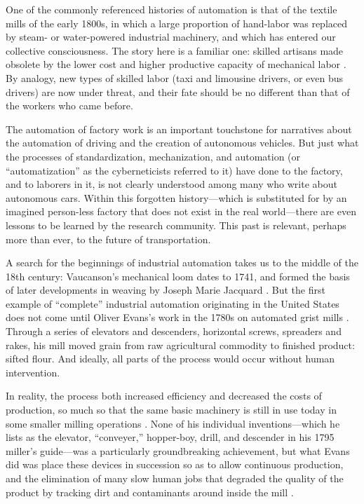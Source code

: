 One of the commonly referenced histories of automation is that of the
textile mills of the early 1800s, in which a large
proportion of hand-labor was replaced by steam- or
water-powered industrial machinery, and which has entered our collective
consciousness. The
story here is a familiar one: skilled artisans made obsolete by the
lower cost and higher productive capacity of mechanical labor \cite{pewPositive}. By
analogy, new types of skilled labor (taxi and limousine drivers, or
even bus drivers) are now under threat, and their fate should be no
different than that of the workers who came before.

The automation of factory work is an
important touchstone for narratives about the automation of driving
and the creation of autonomous vehicles. But just what the
processes of standardization, mechanization, and automation (or
``automatization'' as the cyberneticists referred to it) have done to
the factory, and to laborers in it, is 
not clearly understood among many who write about autonomous cars. Within this
forgotten history---which is substituted for by an imagined person-less
factory that does not exist in the real world---there are even lessons to be
learned by the research community. This past is relevant, perhaps
more than ever, to the future of transportation.

A search for the beginnings of industrial automation takes us to the middle of
the 18th century: Vaucanson's mechanical loom dates to 1741, and formed the basis of
 later developments in weaving by Joseph Marie Jacquard \cite[p. 9]{dieboldImpact}. 
But the first example of ``complete'' industrial automation originating in the
United States does not come until Oliver Evans's work in the 1780s on
automated grist mills \cite[p. 5]{roesmithYankee}. Through a series of elevators and descenders,
horizontal screws, spreaders and rakes, his mill moved grain from raw
agricultural commodity to finished product: sifted flour. And ideally,
all parts of the process would occur without human intervention. 

In reality, the process both increased efficiency and decreased the costs
of production, so much so that the same basic machinery is still in
use today in some smaller milling operations \cite{wyegrist}. None of his individual
inventions---which he lists as the elevator, ``conveyer,'' hopper-boy,
drill, and descender in his 1795 miller's guide---was a particularly
groundbreaking achievement, but what Evans did was place these devices
in succession so as to allow continuous production, and the
elimination of many slow human jobs that degraded the quality of the
product by tracking dirt and contaminants around inside the
mill \cite[p. 203]{evansMillguide}. 

